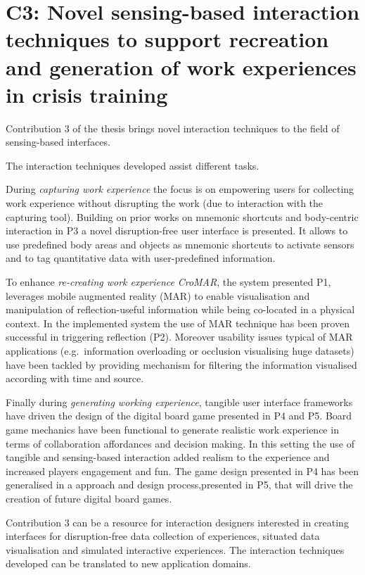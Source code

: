 \section{C3: Novel sensing-based interaction techniques to support recreation and generation of work experiences in crisis training}\label{c3-novel-sensing-based-interaction-techniques-to-support-recreation-and-generation-of-work-experiences-in-crisis-training}

Contribution 3 of the thesis brings novel interaction techniques to the field of sensing-based interfaces.

The interaction techniques developed assist different tasks.

During \emph{capturing work experience} the focus is on empowering users for collecting work experience without disrupting the work (due to interaction with the capturing tool). Building on prior works on mnemonic shortcuts \autocite{Guerreiro:2008wt} and body-centric interaction \autocite{Chen:2012wk} in P3 a novel disruption-free user interface is presented. It allows to use predefined body areas and objects as mnemonic shortcuts to activate sensors and to tag quantitative data with user-predefined information.

To enhance \emph{re-creating work experience} \emph{CroMAR}, the system presented P1, leverages mobile augmented reality (MAR) to enable visualisation and manipulation of reflection-useful information while being co-located in a physical context. In the implemented system the use of MAR technique has been proven successful in triggering reflection (P2). Moreover usability issues typical of MAR applications (e.g.~information overloading or occlusion visualising huge datasets) have been tackled by providing mechanism for filtering the information visualised according with time and source.

Finally during \emph{generating working experience}, tangible user interface frameworks have driven the design of the digital board game presented in P4 and P5. Board game mechanics have been functional to generate realistic work experience in terms of collaboration affordances and decision making. In this setting the use of tangible and sensing-based interaction added realism to the experience and increased players engagement and fun. The game design presented in P4 has been generalised in a approach and design process,presented in P5, that will drive the creation of future digital board games.

Contribution 3 can be a resource for interaction designers interested in creating interfaces for disruption-free data collection of experiences, situated data visualisation and simulated interactive experiences. The interaction techniques developed can be translated to new application domains.

